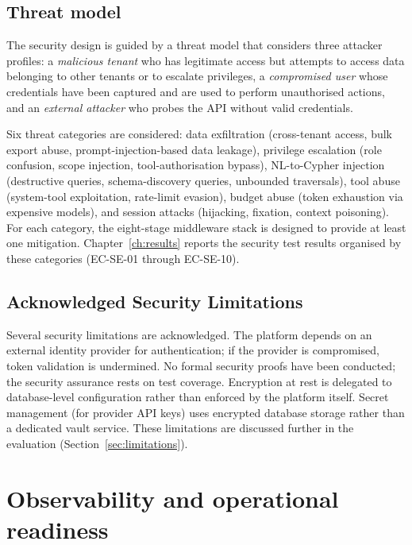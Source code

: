\documentclass[a4paper]{sapthesis}
\begin{document}
\subsection{Threat model}

The security design is guided by a threat model that considers three
attacker profiles: a \emph{malicious tenant} who has legitimate access but
attempts to access data belonging to other tenants or to escalate
privileges, a \emph{compromised user} whose credentials have been captured
and are used to perform unauthorised actions, and an \emph{external
attacker} who probes the API without valid credentials.

Six threat categories are considered: data exfiltration (cross-tenant
access, bulk export abuse, prompt-injection-based data leakage), privilege
escalation (role confusion, scope injection, tool-authorisation bypass),
NL-to-Cypher injection (destructive queries, schema-discovery queries,
unbounded traversals), tool abuse (system-tool exploitation, rate-limit
evasion), budget abuse (token exhaustion via expensive models), and session
attacks (hijacking, fixation, context poisoning).  For each category, the
eight-stage middleware stack is designed to provide at least one mitigation.
Chapter~\ref{ch:results} reports the security test results organised by
these categories (EC-SE-01 through EC-SE-10).

\subsection{Acknowledged Security Limitations}

Several security limitations are acknowledged.  The platform depends on an
external identity provider for authentication; if the provider is
compromised, token validation is undermined.  No formal security proofs
have been conducted; the security assurance rests on test coverage.
Encryption at rest is delegated to database-level configuration rather
than enforced by the platform itself.  Secret management (for provider API
keys) uses encrypted database storage rather than a dedicated vault service.
These limitations are discussed further in the evaluation
(Section~\ref{sec:limitations}).


\section{Observability and operational readiness}
\label{sec:observability}
\end{document}
